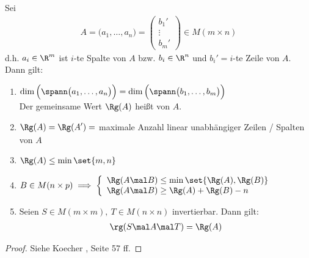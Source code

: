\begin{satz}\label{satz:2.11}
	Sei
	\begin{align*}
		A=\big(a_1,\ldots,a_n\big)=\begin{pmatrix}
			b_1'\\
			\vdots\\
			b_m'
		\end{pmatrix}\in M(m\times n)
	\end{align*}
	d.h. $a_i\in\R^m$ ist $i$-te Spalte von $A$ bzw. $b_i\in\R^n$ und $b_i'=i$-te Zeile von $A$.
	Dann gilt:
	\begin{enumerate}[label=(\alph*)]
		\item $\begin{aligned}
			 \dim\Big(\spann\big(a_1,\ldots,a_n\big)\Big)
			 =\dim\Big(\spann\big(b_1,\ldots,b_m\big)\Big) 
			 \label{item:satz2.11(a)}
		\end{aligned}$\\
		Der gemeinsame Wert $\Rg(A)$ heißt  von $A$.
		\item $\begin{aligned}
			 \Rg(A)=\Rg(A')=
			 \label{item:satz2.11(b)}
		\end{aligned}$ maximale Anzahl linear unabhängiger Zeilen / Spalten von $A$
		\item $\begin{aligned}
			\Rg(A)\leq\min\set{m,n}
			\label{item:satz2.11(c)}
		\end{aligned}$
		\item $\begin{aligned}
			B\in M(n\times p)\implies\left\lbrace
			\begin{array}{l}
				\Rg(A\mal B)\leq\min\set{\Rg(A),\Rg(B)}\\
				\Rg(A\mal B)\geq\Rg(A)+\Rg(B)-n
			\end{array}\right.
			\label{item:satz2.11(d)}
		\end{aligned}$
		\item Seien $S\in M(m\times m),~T\in M(n\times n)$ invertierbar.
		Dann gilt: \label{item:satz2.11(e)}
		\begin{align*}
			\rg(S\mal A\mal T)=\Rg(A)
		\end{align*}
	\end{enumerate}
\end{satz}

\begin{proof}
	Siehe Koecher \cite{koecher2013lineare}, Seite 57 ff.
\end{proof}

